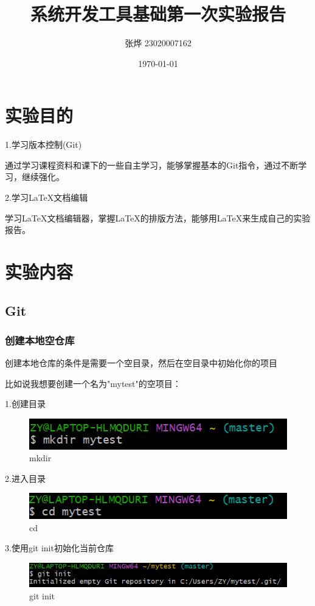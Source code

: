\documentclass{ctexart}
\title{系统开发工具基础第一次实验报告}
\author{张烨 23020007162}
\date{\today}
\begin{document}
	\maketitle
	\tableofcontents
	\newpage
	\section{实验目的}
	1.学习版本控制(Git)
	
	通过学习课程资料和课下的一些自主学习，能够掌握基本的Git指令，通过不断学习，继续强化。
	
	2.学习LaTeX文档编辑
	
	学习LaTeX文档编辑器，掌握LaTeX的排版方法，能够用LaTeX来生成自己的实验报告。
	\section{实验内容}
	\subsection{Git}
	\subsubsection{创建本地空仓库}
	创建本地仓库的条件是需要一个空目录，然后在空目录中初始化你的项目
	
	比如说我想要创建一个名为"mytest"的空项目：
	
	1.创建目录
	\begin{figure}[H]
		\centering
		\includegraphics{mkdir}
		\caption{mkdir}
	\end{figure}
	
	2.进入目录
	\begin{figure}[H]
		\centering
		\includegraphics{cd}
		\caption{cd}
	\end{figure}
	
	3.使用git init初始化当前仓库
	\begin{figure}[H]
		\centering
		\includegraphics{git init}
		\caption{git init}
	\end{figure}
	
\end{document}
